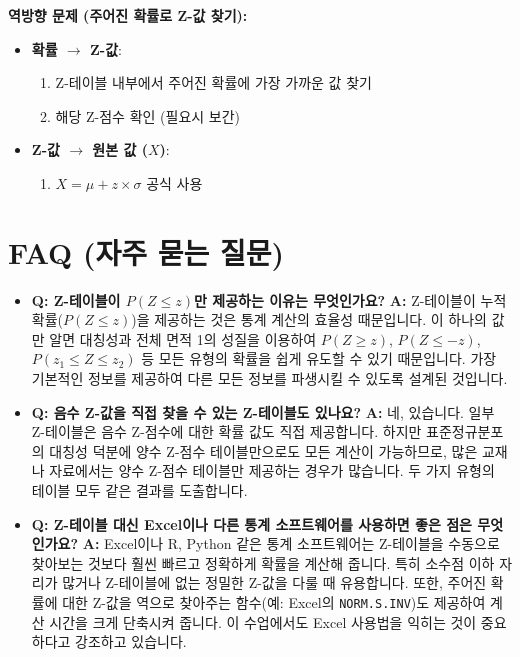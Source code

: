 \documentclass[11pt,a4paper]{book}
\providecommand{\newsection}{\section}
\theoremstyle{definition}
\begin{document}
\begin{summarybox}
\textbf{역방향 문제 (주어진 확률로 Z-값 찾기):}
\begin{itemize}
    \item \textbf{확률 $\rightarrow$ Z-값}:
        \begin{enumerate}
            \item Z-테이블 내부에서 주어진 확률에 가장 가까운 값 찾기
            \item 해당 Z-점수 확인 (필요시 보간)
        \end{enumerate}
    \item \textbf{Z-값 $\rightarrow$ 원본 값 ($X$)}:
        \begin{enumerate}
            \item $X = \mu + z \times \sigma$ 공식 사용
        \end{enumerate}
\end{itemize}
\end{summarybox}

\newsection*{FAQ (자주 묻는 질문)}

\begin{itemize}
    \item \textbf{Q: Z-테이블이 $P(Z \le z)$만 제공하는 이유는 무엇인가요?}
    \textbf{A:} Z-테이블이 누적 확률($P(Z \le z)$)을 제공하는 것은 통계 계산의 효율성 때문입니다. 이 하나의 값만 알면 대칭성과 전체 면적 1의 성질을 이용하여 $P(Z \ge z)$, $P(Z \le -z)$, $P(z_1 \le Z \le z_2)$ 등 모든 유형의 확률을 쉽게 유도할 수 있기 때문입니다. 가장 기본적인 정보를 제공하여 다른 모든 정보를 파생시킬 수 있도록 설계된 것입니다.

    \item \textbf{Q: 음수 Z-값을 직접 찾을 수 있는 Z-테이블도 있나요?}
    \textbf{A:} 네, 있습니다. 일부 Z-테이블은 음수 Z-점수에 대한 확률 값도 직접 제공합니다. 하지만 표준정규분포의 대칭성 덕분에 양수 Z-점수 테이블만으로도 모든 계산이 가능하므로, 많은 교재나 자료에서는 양수 Z-점수 테이블만 제공하는 경우가 많습니다. 두 가지 유형의 테이블 모두 같은 결과를 도출합니다.

    \item \textbf{Q: Z-테이블 대신 Excel이나 다른 통계 소프트웨어를 사용하면 좋은 점은 무엇인가요?}
    \textbf{A:} Excel이나 R, Python 같은 통계 소프트웨어는 Z-테이블을 수동으로 찾아보는 것보다 훨씬 빠르고 정확하게 확률을 계산해 줍니다. 특히 소수점 이하 자리가 많거나 Z-테이블에 없는 정밀한 Z-값을 다룰 때 유용합니다. 또한, 주어진 확률에 대한 Z-값을 역으로 찾아주는 함수(예: Excel의 \texttt{NORM.S.INV})도 제공하여 계산 시간을 크게 단축시켜 줍니다. 이 수업에서도 Excel 사용법을 익히는 것이 중요하다고 강조하고 있습니다.
\end{itemize}
\end{document}
